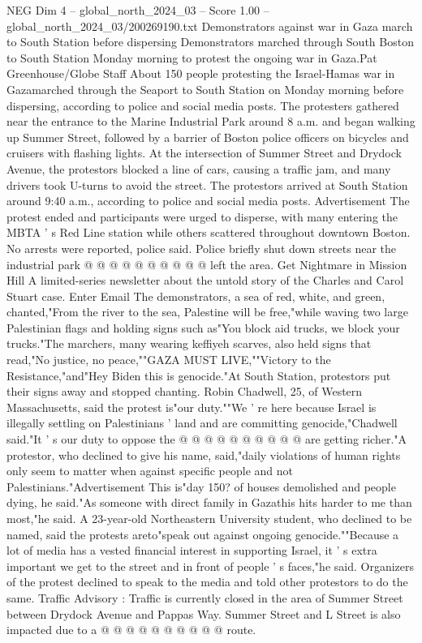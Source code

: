 \begin{textsample}{NEG Dim 4 – global\_north\_2024\_03 – Score 1.00 – global\_north\_2024\_03/200269190.txt}  \label{ex:f4_neg_225}
Demonstrators against war in Gaza march to South Station before dispersing Demonstrators marched through South Boston to South Station Monday morning to protest the ongoing war in Gaza.Pat Greenhouse/Globe Staff About 150 people protesting the Israel-Hamas war in Gazamarched through the Seaport to South Station on Monday morning before dispersing, according to police and social media posts.
The protesters gathered near the entrance to the Marine Industrial Park around 8 a.m. and began walking up Summer Street, followed by a barrier of Boston police officers on bicycles and cruisers with flashing lights.
At the intersection of Summer Street and Drydock Avenue, the protestors blocked a line of cars, causing a traffic jam, and many drivers took U-turns to avoid the street.
The protestors arrived at South Station around 9:40 a.m., according to police and social media posts.
Advertisement The protest ended and participants were urged to disperse, with many entering the MBTA ' s Red Line station while others scattered throughout downtown Boston.
No arrests were reported, police said.
Police briefly shut down streets near the industrial park @ @ @ @ @ @ @ @ @ @ left the area.
Get Nightmare in Mission Hill A limited-series newsletter about the untold story of the Charles and Carol Stuart case.
Enter Email The demonstrators, a sea of red, white, and green, chanted,"From the river to the sea, Palestine will be free,"while waving two large Palestinian flags and holding signs such as"You block aid trucks, we block your trucks."The marchers, many wearing keffiyeh scarves, also held signs that read,"No justice, no peace,""GAZA MUST LIVE,""Victory to the Resistance,"and"Hey Biden this is genocide."At South Station, protestors put their signs away and stopped chanting.
Robin Chadwell, 25, of Western Massachusetts, said the protest is"our duty.""We ' re here because Israel is illegally settling on Palestinians ' land and are committing genocide,"Chadwell said."It ' s our duty to oppose the @ @ @ @ @ @ @ @ @ @ are getting richer."A protestor, who declined to give his name, said,"daily violations of human rights only seem to matter when against specific people and not Palestinians."Advertisement This is"day 150? of houses demolished and people dying, he said."As someone with direct family in Gazathis hits harder to me than most,"he said.
A 23-year-old Northeastern University student, who declined to be named, said the protests areto"speak out against ongoing genocide.""Because a lot of media has a vested financial interest in supporting Israel, it ' s extra important we get to the street and in front of people ' s faces,"he said.
Organizers of the protest declined to speak to the media and told other protestors to do the same.
Traffic Advisory : Traffic is currently closed in the area of Summer Street between Drydock Avenue and Pappas Way.
Summer Street and L Street is also impacted due to a @ @ @ @ @ @ @ @ @ @ route.

\end{textsample}
